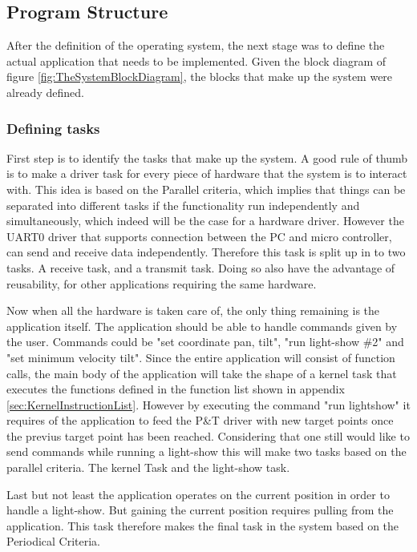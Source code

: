 \subsection{Program Structure}
\label{sec:ProgramStructure}

After the definition of the operating system, the next stage was to define the actual application that needs to be implemented. Given the block diagram of figure \ref{fig:TheSystemBlockDiagram}, the blocks that make up the system were already defined.

\subsubsection{Defining tasks}
\label{sec:DefiningTasks}
First step is to identify the tasks that make up the system. A good rule of thumb is to make a driver task for every piece of hardware that the system is to interact with. This idea is based on the Parallel criteria, which implies that things can be separated into different tasks if the functionality run independently and simultaneously, which indeed will be the case for a hardware driver.
However the UART0 driver that supports connection between the PC and micro controller, can send and receive data independently. Therefore this task is split up in to two tasks. A receive task, and a transmit task.
Doing so also have the advantage of reusability, for other applications requiring the same hardware. 

Now when all the hardware is taken care of, the only thing remaining is the application itself. The application should be able to handle commands given by the user. Commands could be "set coordinate pan, tilt", "run light-show \#2" and "set minimum velocity tilt". Since the entire application will consist of function calls, the main body of the application will take the shape of a kernel task that executes the functions defined in the function list shown in appendix 
\ref{sec:KernelInstructionList}. However by executing the command "run lightshow" it requires of the application to feed the P\&T driver with new target points once the previus target point has been reached. Considering that one still would like to send commands while running a light-show this will make two tasks based on the parallel criteria. The kernel Task and the light-show task.

Last but not least the application operates on the current position in order to handle a light-show. But gaining the current position requires pulling from the application. This task therefore makes the final task in the system based on the Periodical Criteria. 

